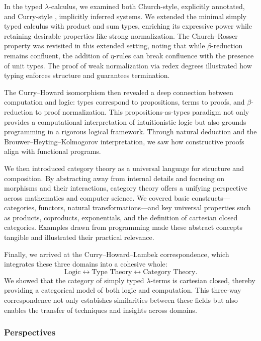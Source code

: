 In the typed $\lambda$-calculus, we examined both Church-style, explicitly annotated, and Curry-style , implicitly inferred systems. We extended the minimal simply typed calculus with product and sum types, enriching its expressive power while retaining desirable properties like strong normalization. The Church--Rosser property was revisited in this extended setting, noting that while $\beta$-reduction remains confluent, the addition of $\eta$-rules can break confluence with the presence of unit types. The proof of weak normalization via redex degrees illustrated how typing enforces structure and guarantees termination.

The Curry--Howard isomorphism then revealed a deep connection between computation and logic: types correspond to propositions, terms to proofs, and $\beta$-reduction to proof normalization. This propositions-as-types paradigm not only provides a computational interpretation of intuitionistic logic but also grounds programming in a rigorous logical framework. Through natural deduction and the Brouwer--Heyting--Kolmogorov interpretation, we saw how constructive proofs align with functional programs.

We then introduced category theory as a universal language for structure and composition. By abstracting away from internal details and focusing on morphisms and their interactions, category theory offers a unifying perspective across mathematics and computer science. We covered basic constructs---categories, functors, natural transformations---and key universal properties such as products, coproducts, exponentials, and the definition of cartesian closed categories. Examples drawn from programming made these abstract concepts tangible and illustrated their practical relevance.

Finally, we arrived at the Curry--Howard--Lambek correspondence, which integrates these three domains into a cohesive whole:
\[
\text{Logic} \longleftrightarrow
\text{Type Theory} \longleftrightarrow 
\text{Category Theory}.
\]
We showed that the category of simply typed $\lambda$-terms is cartesian closed, thereby providing a categorical model of both logic and computation. This three-way correspondence not only estabishes similarities between these fields but also enables the transfer of techniques and insights across domains.

\subsubsection{\centering Perspectives}

